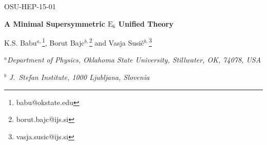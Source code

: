 \documentclass[a4paper,12pt]{article}
\begin{document}

\begin{flushright}
OSU-HEP-15-01
\end{flushright}

\vspace*{0.8in}

\bigskip

\begin{center}

{\Large\bf A Minimal Supersymmetric $\mathrm{E}_6$ Unified Theory}

\vspace{1cm}

\centerline{
K.S. Babu$^{a,}$\footnote{babu@okstate.edu},
Borut Bajc$^{b,}$\footnote{borut.bajc@ijs.si} and
Vasja Susi\v c$^{b,}$\footnote{vasja.susic@ijs.si}
}
\vspace{0.5cm}
\centerline{$^{a}${\it\small Department of Physics, Oklahoma State University, Stillwater, OK, 74078, USA }}
\centerline{$^{b}$ {\it\small J.\ Stefan Institute, 1000 Ljubljana, Slovenia}}
\end{center}

\bigskip

\begin{abstract}
We show explicitly that supersymmetric $E_6$ Grand Unified Theory with a Higgs sector consisting of $\{27+\overline{27}+351'+\overline{351'}+78\}$ fields provides a realistic scenario for symmetry breaking and fermion mass generation.  While gauge symmetry breaking can be achieved without the
$78$ field, its presence is critical for a successful doublet-triplet mass splitting. The Yukawa sector of the model consists of only two symmetric matrices describing all of quark, lepton and neutrino masses and mixings. The fermion mass matrices are computed at low energy and a fit to the second and third generation masses and mixings is performed. We find a good numerical fit to the low-energy data.  Thus, this model, having $11$ superpotential parameters, alongside the two symmetric Yukawa matrices, seems to be the best realistic candidate for a minimal renormalizable supersymmetric $E_6$ unified theory.
\end{abstract}



\clearpage
\end{document}
